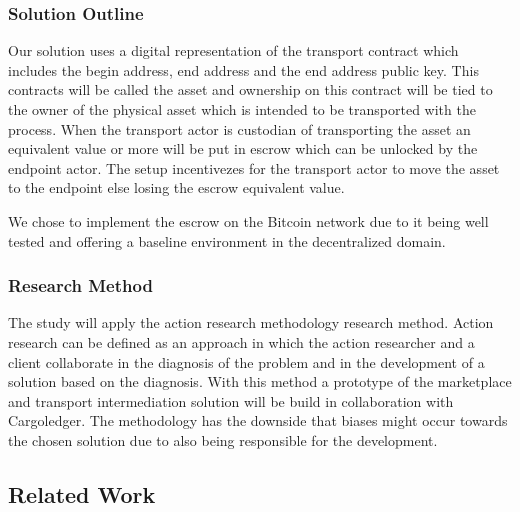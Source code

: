 \subsubsection{Solution Outline}

Our solution uses a digital representation of the transport contract which includes the begin address, end address and the end address public key. This contracts will be called the asset and ownership on this contract will be tied to the owner of the physical asset which is intended to be transported with the process. When the transport actor is custodian of transporting the asset an equivalent value or more will be put in escrow which can be unlocked by the endpoint actor. The setup incentivezes for the transport actor to move the asset to the endpoint else losing the escrow equivalent value. \par
We chose to implement the escrow on the Bitcoin network due to it being well tested and offering a baseline environment in the decentralized domain.

%

\subsubsection{Research Method}

The study will apply the action research methodology research method. Action research can be defined as an approach in which the action researcher and a client collaborate in the diagnosis of the problem and in the development of a solution based on the diagnosis. With this method a prototype of the marketplace and transport intermediation solution will be build in collaboration with Cargoledger. The methodology has the downside that biases might occur towards the chosen solution due to also being responsible for the development.\par

\subsection{Related Work}

